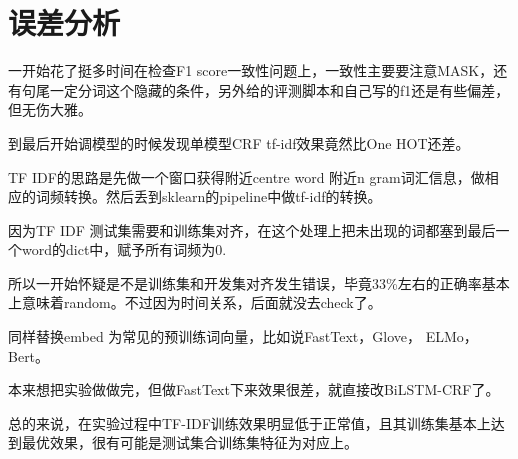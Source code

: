 \section{误差分析}
\label{sec:analysis}

一开始花了挺多时间在检查F1 score一致性问题上，一致性主要要注意MASK，还有句尾一定分词这个隐藏的条件，另外给的评测脚本和自己写的f1还是有些偏差，但无伤大雅。

到最后开始调模型的时候发现单模型CRF tf-idf效果竟然比One HOT还差。

TF IDF的思路是先做一个窗口获得附近centre word 附近n gram词汇信息，做相应的词频转换。然后丢到sklearn的pipeline中做tf-idf的转换。

因为TF IDF 测试集需要和训练集对齐，在这个处理上把未出现的词都塞到最后一个word的dict中，赋予所有词频为0.

所以一开始怀疑是不是训练集和开发集对齐发生错误，毕竟33\%左右的正确率基本上意味着random。不过因为时间关系，后面就没去check了。

同样替换embed 为常见的预训练词向量，比如说FastText，Glove， ELMo， Bert。

本来想把实验做做完，但做FastText下来效果很差，就直接改BiLSTM-CRF了。

总的来说，在实验过程中TF-IDF训练效果明显低于正常值，且其训练集基本上达到最优效果，很有可能是测试集合训练集特征为对应上。

